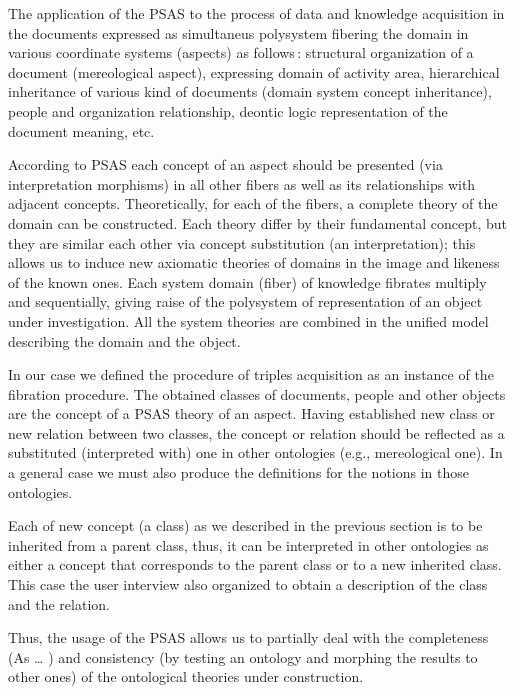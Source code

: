 \documentclass[utf8]{../IncArticle}
\begin{document}
The application of the PSAS to the process of data and knowledge acquisition in the documents expressed as simultaneus polysystem fibering the domain in various coordinate systems (aspects) as follows\,: structural organization of a document (mereological aspect), expressing domain of activity area, hierarchical inheritance of various kind of documents (domain system concept inheritance), people and organization relationship, deontic logic representation of the document meaning, etc.

According to PSAS \cite{father} each concept of an aspect should be presented (via interpretation morphisms) in all other fibers as well as its relationships with adjacent concepts.  Theoretically, for each of the fibers, a complete theory of the domain can be constructed.  Each theory differ by their fundamental concept, but they are similar each other via concept substitution (an interpretation); this allows us to induce new axiomatic theories of domains in the image and likeness of the known ones.  Each system domain (fiber) of knowledge fibrates multiply and sequentially, giving raise of the polysystem of representation of an object under investigation.  All the system theories are combined in the unified model describing the domain and the object.

In our case we defined the procedure of triples acquisition as an instance of the fibration procedure.  The obtained classes of documents, people and other objects are the concept of a PSAS theory of an aspect.  Having established new class or new relation between two classes, the concept or relation should be reflected as a substituted (interpreted with) one in other ontologies (e.g., mereological one).  In a general case we must also produce the definitions for the notions in those ontologies.

Each of new concept (a class) as we described in the previous section
is to be inherited from a parent class, thus, it can be interpreted in
other ontologies as either a concept that corresponds to the parent
class or to a new inherited class.  This case the user interview also
organized to obtain a description of the class and the relation.

Thus, the usage of the PSAS allows us to partially deal with the
completeness (As \ldots{} \cite{sergey}) and consistency (by testing
an ontology and morphing the results to other ones) of the ontological
theories under construction.
\end{document}
